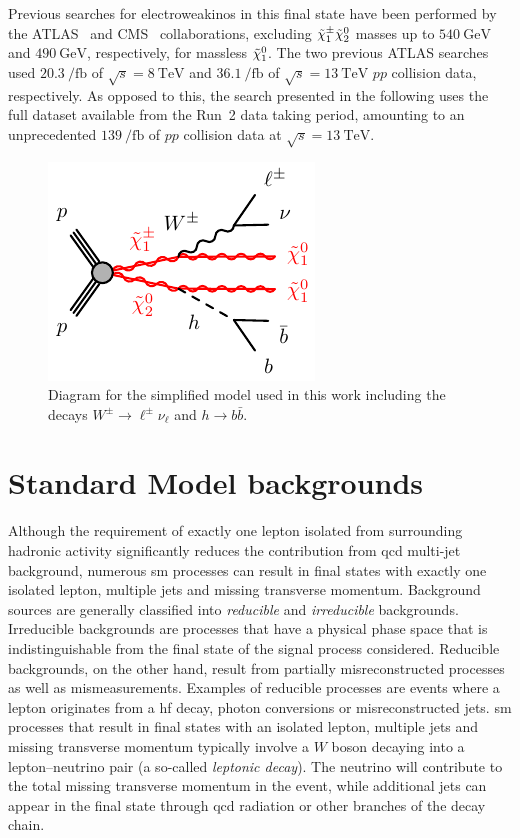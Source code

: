 Previous searches for electroweakinos in this final state have been performed by the ATLAS~\cite{SUSY-2013-23,SUSY-2017-01} and CMS~\cite{CMS-SUS-16-043} collaborations, excluding $\tilde{\chi}_1^\pm\tilde{\chi}_2^0$ masses up to $\SI{540}{\GeV}$ and $\SI{490}{\GeV}$, respectively, for massless $\tilde{\chi}_1^0$. The two previous ATLAS searches used $\SI{20.3}{\per\femto\barn}$ of $\sqrt{s}=\SI{8}{\TeV}$ and $\SI{36.1}{\per\femto\barn}$ of $\sqrt{s}=\SI{13}{\TeV}$ $pp$ collision data, respectively. As opposed to this, the search presented in the following uses the full dataset available from the Run~2 data taking period, amounting to an unprecedented $\SI{139}{\per\femto\barn}$ of $pp$ collision data at $\sqrt{s}=\SI{13}{\TeV}$.

\begin{figure}
	\centering\includegraphics[width=.4\textwidth]{model_c1n2_Wh}
	\caption{Diagram for the simplified model used in this work including the decays $W^\pm\rightarrow\ell^\pm\nu_\ell$ and $h\rightarrow b\bar{b}$.}\label{fig:Wh_model_full}
\end{figure}

\section{Standard Model backgrounds}

Although the requirement of exactly one lepton isolated from surrounding hadronic activity significantly reduces the contribution from \gls{qcd} multi-jet background, numerous \gls{sm} processes can result in final states with exactly one isolated lepton, multiple jets and missing transverse momentum. Background sources are generally classified into \textit{reducible} and \textit{irreducible} backgrounds. Irreducible backgrounds are processes that have a physical phase space that is indistinguishable from the final state of the signal process considered. Reducible backgrounds, on the other hand, result from partially misreconstructed processes as well as mismeasurements. Examples of reducible processes are events where a lepton originates from a \gls{hf} decay, photon conversions or misreconstructed jets. \gls{sm} processes that result in final states with an isolated lepton, multiple jets and missing transverse momentum typically involve a $W$ boson decaying into a lepton--neutrino pair (a so-called \textit{leptonic decay}). The neutrino will contribute to the total missing transverse momentum in the event, while additional jets can appear in the final state through \gls{qcd} radiation or other branches of the decay chain.

